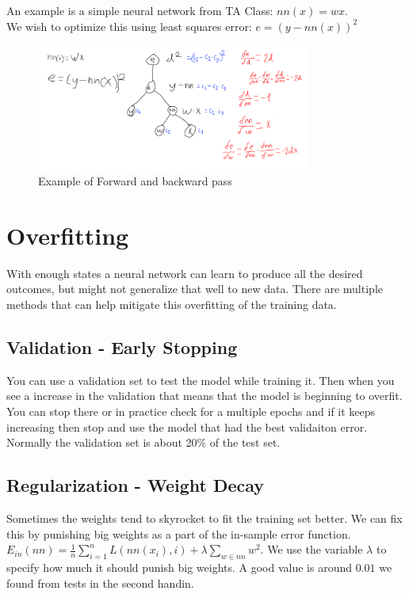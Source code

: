 \documentclass{article}
\begin{document}
  An example is a simple neural network from TA Class: $nn(x) = w x$.\\
  We wish to optimize this using least squares error: $e = (y-nn(x))^2$\\
  \begin{figure}[H]
      \centering
      \includegraphics[width=0.8\textwidth]{ForwardNBaclPass.png}
      \caption{Example of Forward and backward pass}
      \label{fig:my_label}
  \end{figure}


\section{Overfitting}
  With enough states a neural network can learn to produce all the desired outcomes, but might not generalize that well to new data.
  There are multiple methods that can help mitigate this overfitting of the training data.
  \subsection{Validation - Early Stopping}
    You can use a validation set to test the model while training it. Then when you see a increase in the validation that means that the model is beginning to overfit.
    You can stop there or in practice check for a multiple epochs and if it keeps increasing then stop and use the model that had the best validaiton error.
    Normally the validation set is about 20\% of the test set.
  \subsection{Regularization - Weight Decay}
    Sometimes the weights tend to skyrocket to fit the training set better. 
    We can fix this by punishing big weights as a part of the in-sample error function.\\
    $E_{in}(nn) = \frac{1}{n}\sum_{i=1}^n L(nn(x_i), i) + \lambda \sum_{w\in nn}w^2$.
    We use the variable $\lambda$ to specify how much it should punish big weights. A good value is around $0.01$ we found from tests in the second handin.
\end{document}
